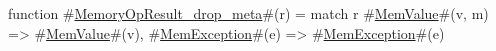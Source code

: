 function #\hyperref[sailRISCVzMemoryOpResultzydropzymeta]{MemoryOpResult\_drop\_meta}#(r) = match r {
  #\hyperref[sailRISCVzMemValue]{MemValue}#(v, m)  => #\hyperref[sailRISCVzMemValue]{MemValue}#(v),
  #\hyperref[sailRISCVzMemException]{MemException}#(e) => #\hyperref[sailRISCVzMemException]{MemException}#(e)
}
